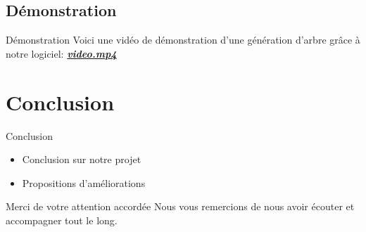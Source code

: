\documentclass{beamer}
\begin{document}
\subsection{Démonstration}
\begin{frame}{Démonstration}
	Voici une vidéo de démonstration d'une génération d'arbre grâce à notre logiciel:
    \textbf{\textit{\href{run:video/demoLScuted.mp4}{video.mp4}}}
\end{frame}
\section{Conclusion}

\begin{frame}{Conclusion}
    \begin{itemize}
        \item Conclusion sur notre projet
        \item Propositions d'améliorations
    \end{itemize}
\end{frame}
\begin{frame}{Merci de votre attention accordée}
    Nous vous remercions de nous avoir écouter et accompagner tout le long.
\end{frame}
\end{document}
